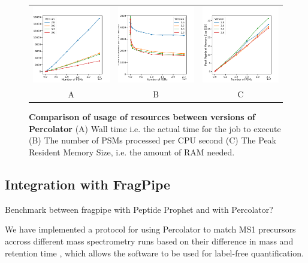 \documentclass{article}
\begin{document}
\begin{figure}
  \begin{center}
    \begin{tabular}{ccc}
    \includegraphics[width=0.3\linewidth]{img/wall.png} &
    \includegraphics[width=0.3\linewidth]{img/rate.png} &
    \includegraphics[width=0.3\linewidth]{img/memory.png} \\
    A & B & C \\
    \end{tabular}
    \caption{\textbf{Comparison of usage of resources between versions of Percolator} 
    (A) Wall time i.e. the actual time for the job to execute (B) The number of PSMs processed per CPU second 
    (C) The Peak Resident Memory Size, i.e. the amount of RAM needed.}
    \label{fig:x}
  \end{center}
\end{figure}

\subsection{Integration with FragPipe}

Benchmark between fragpipe with Peptide Prophet and with Percolator?

We have implemented a protocol for using Percolator to match MS1 precursors accross different mass spectrometry runs based on their difference in mass and retention time \cite{the:focus}, which allows the software to be used for label-free quantification.
\end{document}
